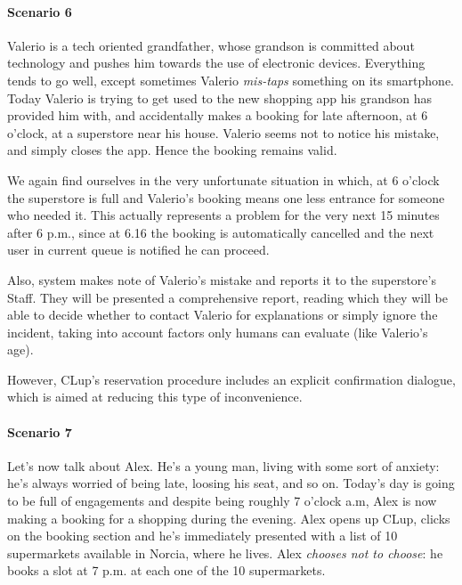 \paragraph{Scenario 6}
Valerio is a tech oriented grandfather, whose grandson is committed about technology and pushes him towards the use of electronic devices.\newline
Everything tends to go well, except sometimes Valerio \textit{mis-taps} something on its smartphone. Today Valerio is trying to get used to the new shopping app his grandson has provided him with, and accidentally makes a booking for late afternoon, at 6 o'clock, at a superstore near his house.\newline
Valerio seems not to notice his mistake, and simply closes the app. Hence the booking remains valid.

We again find ourselves in the very unfortunate situation in which, at 6 o'clock the superstore is full and Valerio's booking means one less entrance for someone who needed it. This actually represents a problem for the very next 15 minutes after 6 p.m., since at 6.16 the booking is automatically cancelled and the next user in current queue is notified he can proceed. 

Also, system makes note of Valerio's mistake and reports it to the superstore's Staff. They will be presented a comprehensive report, reading which they will be able to decide whether to contact Valerio for explanations or simply ignore the incident, taking into account factors only humans can evaluate (like Valerio's age).\newline

However, CLup's reservation procedure includes an explicit confirmation dialogue, which is aimed at reducing this type of inconvenience.

\paragraph{Scenario 7}

Let's now talk about Alex. He's a young man, living with some sort of anxiety: he's always worried of being late, loosing his seat, and so on.
Today's day is going to be full of engagements and despite being roughly 7 o'clock a.m, Alex is now making a booking for a shopping during the evening. \newline
Alex opens up CLup, clicks on the booking section and he's immediately presented with a list of 10 supermarkets available in Norcia, where he lives. Alex \textit{chooses not to choose}: he books a slot at 7 p.m. at each one of the 10 supermarkets.

